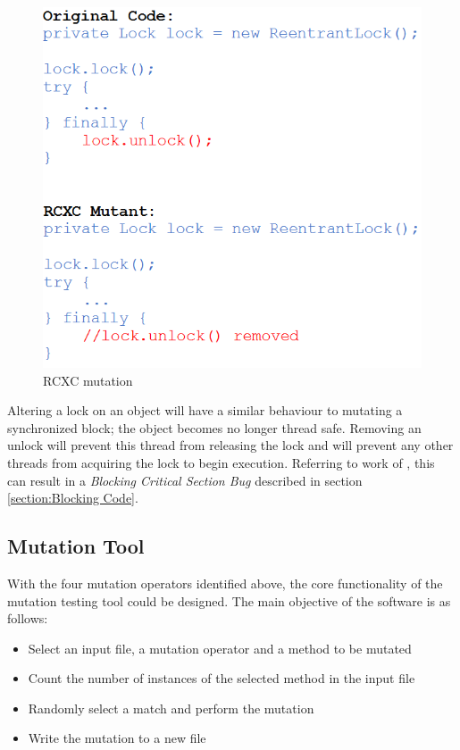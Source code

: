 \documentclass[a4paper,12pt]{article}
\begin{document}
\begin{figure}[h]
    \centering
    \includegraphics[scale = 0.6]{RCXC.png}
    \caption{RCXC mutation \citep{bradbury06}}
    \label{fig:RCXC}
\end{figure}	

Altering a lock on an object will have a similar behaviour to mutating a synchronized block; the object becomes no longer thread safe. Removing an unlock will prevent this thread from releasing the lock and will prevent any other threads from acquiring the lock to begin execution. Referring to work of \citet{farchi03}, this can result in a \textit{Blocking Critical Section Bug} described in section \ref{section:Blocking Code}.   
  	
	
\subsection{Mutation Tool}

With the four mutation operators identified above, the core functionality of the mutation testing tool could be designed. The main objective of the software is as follows: 

\begin{itemize}
    \item Select an input file, a mutation operator and a method to be mutated
    \item Count the number of instances of the selected method in the input file
    \item Randomly select a match and perform the mutation
    \item Write the mutation to a new file
\end{itemize}
\end{document}

